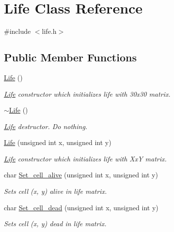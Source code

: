 \hypertarget{class_life}{}\section{Life Class Reference}
\label{class_life}


{\ttfamily \#include $<$life.\+h$>$}

\subsection*{Public Member Functions}
\begin{DoxyCompactItemize}
\item 
\mbox{\hyperlink{class_life_a6de2a371f6f778f8b4938d219390b746}{Life}} ()
\begin{DoxyCompactList}\small\item\em \mbox{\hyperlink{class_life}{Life}} constructor which initializes life with 30x30 matrix. \end{DoxyCompactList}\item 
\mbox{\hyperlink{class_life_ac5a521e06906fb4f834001b2b4f7adc7}{$\sim$\+Life}} ()
\begin{DoxyCompactList}\small\item\em \mbox{\hyperlink{class_life}{Life}} destructor. Do nothing. \end{DoxyCompactList}\item 
\mbox{\hyperlink{class_life_a504a89dac4f882dc86dc4c87a430d48d}{Life}} (unsigned int x, unsigned int y)
\begin{DoxyCompactList}\small\item\em \mbox{\hyperlink{class_life}{Life}} constructor which initializes life with XxY matrix. \end{DoxyCompactList}\item 
char \mbox{\hyperlink{class_life_af819167ad2ff35b239efb465cabe8b73}{Set\+\_\+cell\+\_\+alive}} (unsigned int x, unsigned int y)
\begin{DoxyCompactList}\small\item\em Sets cell (x, y) alive in life matrix. \end{DoxyCompactList}\item 
char \mbox{\hyperlink{class_life_ac506a1a9dad0d9fe50eaa7f7c7ffcce4}{Set\+\_\+cell\+\_\+dead}} (unsigned int x, unsigned int y)
\begin{DoxyCompactList}\small\item\em Sets cell (x, y) dead in life matrix. \end{DoxyCompactList}\item 

\end{DoxyCompactItemize}
